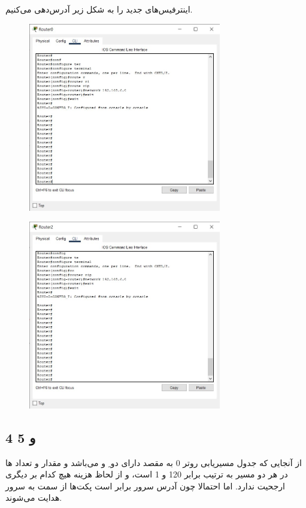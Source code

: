 \documentclass{article}
\begin{document}
\subsection{}
اینترفیس‌های جدید را به شکل زیر آدرس‌دهی می‌کنیم.
\begin{figure}[H]
    \centering
    \includegraphics[width=0.75\textwidth]{figures/20.jpg}
    \caption{}
    \label{fig:fig1}
\end{figure}
\begin{figure}[H]
    \centering
    \includegraphics[width=0.75\textwidth]{figures/21.jpg}
    \caption{}
    \label{fig:fig1}
\end{figure}


\subsection{4 و 5}
از آنجایی که جدول مسیریابی روتر 0 به مقصد  دارای دو ِ   و   می‌باشد و مقدار  و تعداد ها در هر دو مسیر به ترتیب برابر 120 و 1 است، و از لحاظ هزینه هیچ کدام بر دیگری ارجحیت ندارد. اما احتمالا چون آدرس  سرور برابر  است پکت‌ها از سمت  به سرور هدایت می‌شوند.
\end{document}
